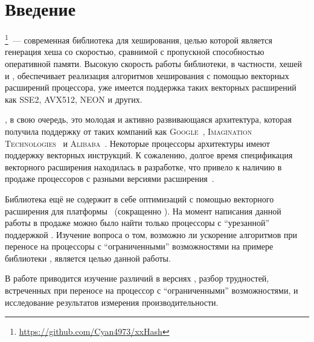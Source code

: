 
\section*{Введение}
\thispagestyle{withCompileDate}

\xxHash{}\footnote{\url{https://github.com/Cyan4973/xxHash}}~--- современная библиотека для хеширования, целью которой является генерация хеша со скоростью, сравнимой с пропускной способностью оперативной памяти.
Высокую скорость работы библиотеки, в частности, хешей  и , обеспечивает реализация алгоритмов хеширования с помощью векторных расширений процессора, уже имеется поддержка таких векторных расширений как \textsc{SSE2, AVX512, NEON} и других.

\riscv{}, в свою очередь, это молодая и активно развивающаяся архитектура, которая получила поддержку от таких компаний как \textsc{Google}~\cite{GoogleAnnouncesOfficial}, \textsc{Imagination Technologies}~\cite{WhyWeVe} и \textsc{Alibaba}~\cite{robinsonAlibabaLaunchesRISCV}.
Некоторые процессоры архитектуры \riscv{} имеют поддержку векторных инструкций.
К сожалению, долгое время спецификация векторного расширения находилась в разработке, что привело к наличию в продаже процессоров с разными версиями расширения~\cite{ImplicationsWidelyDistributed}.

Библиотека \xxHash{} ещё не содержит в себе оптимизаций с помощью векторного расширения для платформы \riscv{}~(сокращенно \rvv{}).
На момент написания данной работы в продаже можно было найти только процессоры с \enquote{урезанной} поддержкой \rvv{}.
Изучение вопроса о том, возможно ли ускорение алгоритмов при переносе на процессоры с \enquote{ограниченными} возможностями на примере библиотеки \xxHash{}, является целью данной работы.

В работе приводится изучение различий в версиях \rvv{}, разбор трудностей, встреченных при переносе на процессор с \enquote{ограниченными} возможностями, и исследование результатов измерения производительности.
